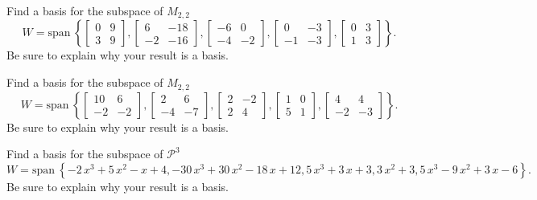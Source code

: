 \documentclass{article}
\begin{document}
\begin{exerciseStatement}
    Find a basis for the subspace of \(M_{2,2}\)
\[W=\mathrm{span}\ \left\{\left[\begin{array}{cc}
0 & 9 \\
3 & 9
\end{array}\right] , \left[\begin{array}{cc}
6 & -18 \\
-2 & -16
\end{array}\right] , \left[\begin{array}{cc}
-6 & 0 \\
-4 & -2
\end{array}\right] , \left[\begin{array}{cc}
0 & -3 \\
-1 & -3
\end{array}\right] , \left[\begin{array}{cc}
0 & 3 \\
1 & 3
\end{array}\right]\right\}.\]
 Be sure to explain why your result is a basis.


  
\end{exerciseStatement}

\begin{exerciseStatement}
    Find a basis for the subspace of \(M_{2,2}\)
\[W=\mathrm{span}\ \left\{\left[\begin{array}{cc}
10 & 6 \\
-2 & -2
\end{array}\right] , \left[\begin{array}{cc}
2 & 6 \\
-4 & -7
\end{array}\right] , \left[\begin{array}{cc}
2 & -2 \\
2 & 4
\end{array}\right] , \left[\begin{array}{cc}
1 & 0 \\
5 & 1
\end{array}\right] , \left[\begin{array}{cc}
4 & 4 \\
-2 & -3
\end{array}\right]\right\}.\]
 Be sure to explain why your result is a basis.


  
\end{exerciseStatement}

\begin{exerciseStatement}
    Find a basis for the subspace of \(\mathcal{P}^3\)
\[W=\mathrm{span}\ \left\{-2 \, x^{3} + 5 \, x^{2} - x + 4 , -30 \, x^{3} + 30 \, x^{2} - 18 \, x + 12 , 5 \, x^{3} + 3 \, x + 3 , 3 \, x^{2} + 3 , 5 \, x^{3} - 9 \, x^{2} + 3 \, x - 6\right\}.\]
 Be sure to explain why your result is a basis.


  
\end{exerciseStatement}
\end{document}
